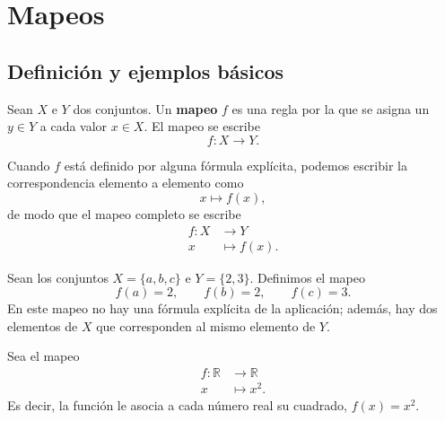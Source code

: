\chapter{Mapeos}

\section{Definición y ejemplos básicos}

\begin{definicion}[Mapeo]
Sean $X$ e $Y$ dos conjuntos. Un \textbf{mapeo} $f$ es una regla por la que se
asigna un $y \in Y$ a cada valor $x \in X$. El mapeo se escribe
\[
f : X \to Y .
\]
\end{definicion}

\begin{center}
\end{center}

Cuando $f$ está definido por alguna fórmula explícita, podemos escribir la
correspondencia elemento a elemento como
\[
x \mapsto f(x),
\]
de modo que el mapeo completo se escribe
\[
\begin{aligned}
f : X &\longrightarrow Y \\
x &\longmapsto f(x).
\end{aligned}
\]

\begin{ejemplo}
Sean los conjuntos $X = \{a,b,c\}$ e $Y = \{2,3\}$. Definimos el mapeo
\[
f(a) = 2, \qquad f(b) = 2, \qquad f(c) = 3 .
\]
En este mapeo no hay una fórmula explícita de la aplicación; además, hay dos
elementos de $X$ que corresponden al mismo elemento de $Y$.
\end{ejemplo}

\begin{ejemplo}
Sea el mapeo
\[
\begin{aligned}
f : \mathbb{R} &\to \mathbb{R}\\
x &\mapsto x^2 .
\end{aligned}
\]
Es decir, la función le asocia a cada número real su cuadrado,
$f(x) = x^2$.
\end{ejemplo}

